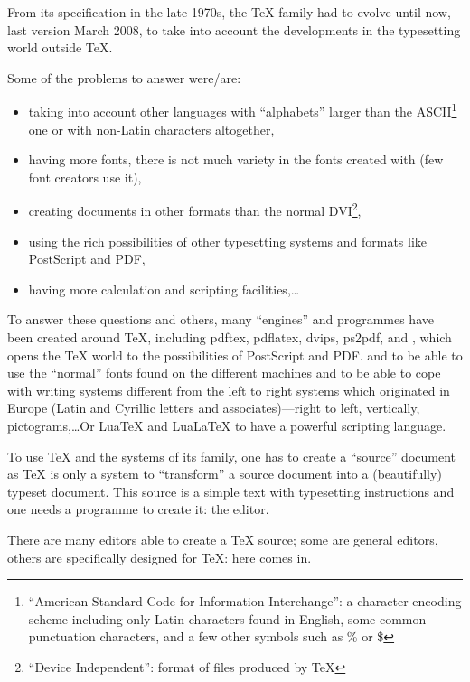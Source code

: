 From its specification in the late 1970s, the {\TeX} family had to evolve until now, last version March 2008, to take into account the developments in the typesetting world outside {\TeX}.

Some of the problems to answer were/are:
\begin{itemize}
	\item taking into account other languages with ``alphabets'' larger than the ASCII\footnote{``American Standard Code for Information Interchange'': a character encoding scheme including only Latin characters found in English, some common punctuation characters, and a few other symbols such as \% or \$} one or with non-Latin characters altogether,
	\item having more fonts, there is not much variety in the fonts created with {\METAFONT} (few font creators use it),
	\item creating documents in other formats than the normal DVI\footnote{``Device Independent'': format of files produced by {\TeX}},
	\item using the rich possibilities of other typesetting systems and formats like PostScript and PDF,
	\item having more calculation and scripting facilities,\dots
\end{itemize}

To answer these questions and others, many ``engines'' and programmes have been created around {\TeX}, including pdftex, pdflatex, dvips, ps2pdf, and {\METAPOST}, which opens the {\TeX} world to the possibilities of PostScript and PDF. \XeTeX{} and {\XeLaTeX} to be able to use the ``normal'' fonts found on the different machines and to be able to cope with writing systems different from the left to right systems which originated in Europe (Latin and Cyrillic letters and associates)---right to left, vertically, pictograms,\dots Or LuaTeX and LuaLaTeX to have a powerful scripting language.

To use {\TeX} and the systems of its family, one has to create a ``source'' document as {\TeX} is only a system to ``transform'' a source document into a (beautifully) typeset document. This source is a simple text with typesetting instructions and one needs a programme to create it: the editor.

There are many editors able to create a {\TeX} source; some are general editors, others are specifically designed for {\TeX}: here \Tw{} comes in.
\bigskip

